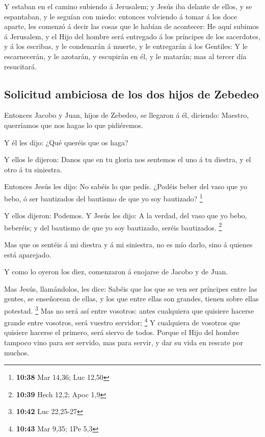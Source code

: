  Y estaban en el camino subiendo á Jerusalem; y Jesús iba
delante de ellos, y se espantaban, y le seguían con miedo: entonces
volviendo á tomar á los doce aparte, les comenzó á decir las cosas que
le habían de acontecer:  He aquí subimos á Jerusalem, y
el Hijo del hombre será entregado á los príncipes de los sacerdotes, y á
los escribas, y le condenarán á muerte, y le entregarán á los Gentiles:
 Y le escarnecerán, y le azotarán, y escupirán en él, y
le matarán; mas al tercer día resucitará.

\hypertarget{solicitud-ambiciosa-de-los-dos-hijos-de-zebedeo}{%
\subsection{Solicitud ambiciosa de los dos hijos de
Zebedeo}\label{solicitud-ambiciosa-de-los-dos-hijos-de-zebedeo}}

 Entonces Jacobo y Juan, hijos de Zebedeo, se llegaron á
él, diciendo: Maestro, querríamos que nos hagas lo que pidiéremos.

 Y él les dijo: ¿Qué queréis que os haga?

 Y ellos le dijeron: Danos que en tu gloria nos sentemos
el uno á tu diestra, y el otro á tu siniestra.

 Entonces Jesús les dijo: No sabéis lo que pedís. ¿Podéis
beber del vaso que yo bebo, ó ser bautizados del bautismo de que yo soy
bautizado? \footnote{\textbf{10:38} Mar 14,36; Luc 12,50}

 Y ellos dijeron: Podemos. Y Jesús les dijo: A la verdad,
del vaso que yo bebo, beberéis; y del bautismo de que yo soy bautizado,
seréis bautizados. \footnote{\textbf{10:39} Hech 12,2; Apoc 1,9}

 Mas que os sentéis á mi diestra y á mi siniestra, no es
mío darlo, sino á quienes está aparejado.

 Y como lo oyeron los diez, comenzaron á enojarse de
Jacobo y de Juan.

 Mas Jesús, llamándolos, les dice: Sabéis que los que se
ven ser príncipes entre las gentes, se enseñorean de ellas, y los que
entre ellas son grandes, tienen sobre ellas potestad. \footnote{\textbf{10:42}
  Luc 22,25-27}  Mas no será así entre vosotros: antes
cualquiera que quisiere hacerse grande entre vosotros, será vuestro
servidor; \footnote{\textbf{10:43} Mar 9,35; 1Pe 5,3}  Y
cualquiera de vosotros que quisiere hacerse el primero, será siervo de
todos.  Porque el Hijo del hombre tampoco vino para ser
servido, mas para servir, y dar su vida en rescate por muchos.


